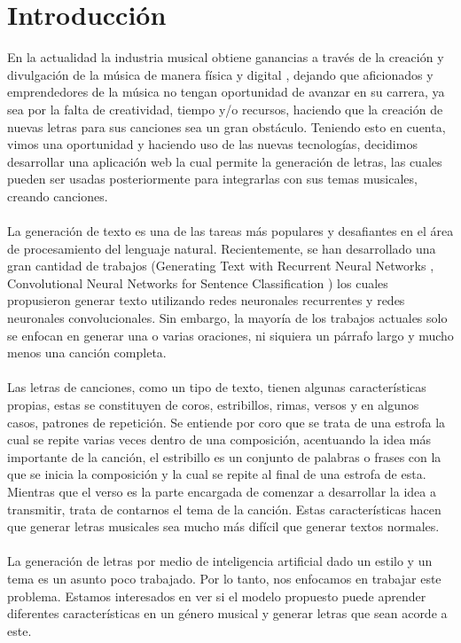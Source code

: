 \section{Introducción}

  En la actualidad la industria musical obtiene ganancias a través de la creación y divulgación de la música de manera física y digital \cite{actmusica}, dejando que aficionados y emprendedores de la música no tengan oportunidad de avanzar en su carrera, ya sea por la falta de creatividad, tiempo y/o recursos, haciendo que la creación de nuevas letras para sus canciones sea un gran obstáculo.
  Teniendo esto en cuenta, vimos una oportunidad y haciendo uso de las nuevas tecnologías, decidimos desarrollar una aplicación web la cual permite la generación de letras, las cuales pueden ser usadas posteriormente para integrarlas con sus temas musicales, creando canciones.\\\\
  La generación de texto es una de las tareas más populares y desafiantes en el área de procesamiento del lenguaje natural. Recientemente, se han desarrollado una gran cantidad de trabajos (Generating Text with Recurrent Neural Networks \cite{refneuralnet}, Convolutional Neural Networks for Sentence Classification \cite{refneuralclass}) los cuales propusieron generar texto utilizando redes neuronales recurrentes y redes neuronales convolucionales. Sin embargo, la mayoría de los trabajos actuales solo se enfocan en generar una o varias oraciones, ni siquiera un párrafo largo y mucho menos una canción completa.\\\\
  Las letras de canciones, como un tipo de texto, tienen algunas características propias, estas se constituyen de coros, estribillos, rimas, versos y en algunos casos, patrones de repetición. Se entiende por coro que se trata de una estrofa la cual se repite varias veces dentro de una composición, acentuando la idea más importante de la canción, el estribillo es un conjunto de palabras o frases con la que se inicia la composición y la cual se repite al final de una estrofa de esta. Mientras que el verso es la parte encargada de comenzar a desarrollar la idea a transmitir, trata de contarnos el tema de la canción. Estas características hacen que generar letras musicales sea mucho más difícil que generar textos normales.\\\\
  La generación de letras por medio de inteligencia artificial dado un estilo y un tema es un asunto poco trabajado. Por lo tanto, nos enfocamos en trabajar este problema. Estamos interesados en ver si el modelo propuesto puede aprender diferentes características en un género musical y generar letras que sean acorde a este.
  
